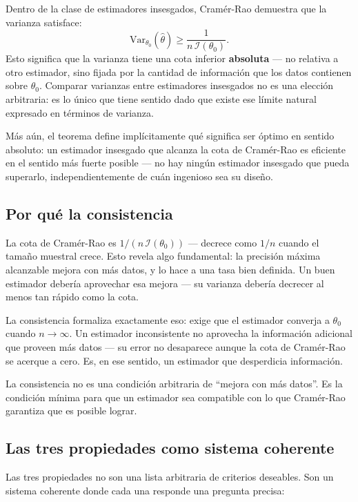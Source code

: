 \documentclass[12pt, a4paper]{book}
\numberwithin{equation}{chapter}
\begin{document}
Dentro de la clase de estimadores insesgados,
Cram\'{e}r-Rao demuestra que la varianza satisface:
\[
\mathrm{Var}_{\theta_0}(\hat{\theta}) \geq
\frac{1}{n\,\mathcal{I}(\theta_0)}.
\]
Esto significa que la varianza tiene una cota inferior
\textbf{absoluta} --- no relativa a otro estimador, sino
fijada por la cantidad de informaci\'{o}n que los datos
contienen sobre $\theta_0$. Comparar varianzas entre
estimadores insesgados no es una elecci\'{o}n arbitraria:
es lo \'{u}nico que tiene sentido dado que existe ese
l\'{i}mite natural expresado en t\'{e}rminos de varianza.

M\'{a}s a\'{u}n, el teorema define impl\'{i}citamente
qu\'{e} significa ser \'{o}ptimo en sentido absoluto: un
estimador insesgado que alcanza la cota de Cram\'{e}r-Rao
es eficiente en el sentido m\'{a}s fuerte posible --- no
hay ning\'{u}n estimador insesgado que pueda superarlo,
independientemente de cu\'{a}n ingenioso sea su
dise\~{n}o.

\subsection{Por qu\'{e} la consistencia}

La cota de Cram\'{e}r-Rao es $1/(n\,\mathcal{I}(\theta_0))$
--- decrece como $1/n$ cuando el tama\~{n}o muestral
crece. Esto revela algo fundamental: la precisi\'{o}n
m\'{a}xima alcanzable mejora con m\'{a}s datos, y lo hace
a una tasa bien definida. Un buen estimador deber\'{i}a
aprovechar esa mejora --- su varianza deber\'{i}a decrecer
al menos tan r\'{a}pido como la cota.

La consistencia formaliza exactamente eso: exige que el
estimador converja a $\theta_0$ cuando $n \to \infty$.
Un estimador inconsistente no aprovecha la informaci\'{o}n
adicional que proveen m\'{a}s datos --- su error no
desaparece aunque la cota de Cram\'{e}r-Rao se acerque
a cero. Es, en ese sentido, un estimador que desperdicia
informaci\'{o}n.

La consistencia no es una condici\'{o}n arbitraria de
``mejora con m\'{a}s datos''. Es la condici\'{o}n m\'{i}nima
para que un estimador sea compatible con lo que
Cram\'{e}r-Rao garantiza que es posible lograr.

\subsection{Las tres propiedades como sistema coherente}

Las tres propiedades no son una lista arbitraria de
criterios deseables. Son un sistema coherente donde
cada una responde una pregunta precisa:
\end{document}
